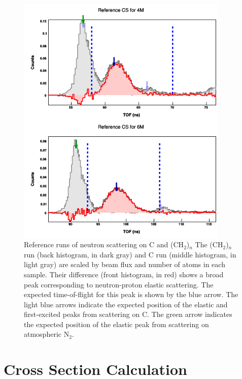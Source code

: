 \begin{figure}
    \includegraphics[width = 0.9\textwidth]{figures/polyethyleneRef.png}
    \caption[Reference runs of neutron scattering on C and (CH$_{2}$)$_{n}$]
    {
        Reference runs of neutron scattering on C and (CH$_{2}$)$_{n}$
        The (CH$_{2}$)$_{n}$ run (back histogram, in dark gray) and C run
        (middle histogram, in light gray) are scaled by beam flux and number of
        atoms in each sample. Their difference (front histogram, in red) shows a
        broad peak corresponding to neutron-proton elastic scattering. The
        expected time-of-flight for this peak is shown by the blue arrow. The light blue arrows 
        indicate the expected position of the elastic and first-excited peaks
        from scattering on C. The green arrow indicates the expected position of
        the elastic peak from scattering on atmospheric N$_{2}$.
    }
    \label{polyethyleneRef}
\end{figure}

\section{Cross Section Calculation}

\begin{equation}
\end{equation}

